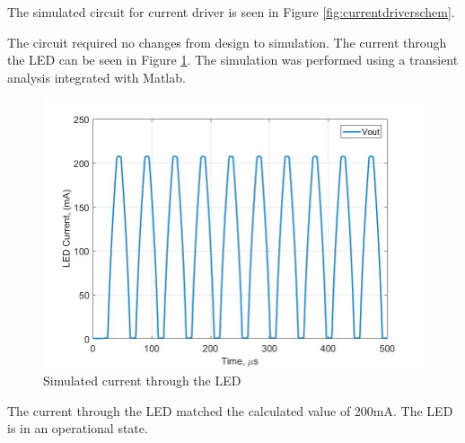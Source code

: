 The simulated circuit for current driver is seen in Figure \ref{fig:currentdriverschem}.

The circuit required no changes from design to simulation. The current through the LED can be seen in Figure \ref{fig:simcurrentlab4}. The simulation was performed using a transient analysis integrated with Matlab.

\begin{figure}
	\centering
	\includegraphics[width=0.7\linewidth]{CircuitDevelopment/sim_current_lab4}
	\caption[Simulated current]{Simulated current through the LED}
	\label{fig:simcurrentlab4}
\end{figure}

The current through the LED matched the calculated value of 200mA. The LED is in an operational state.



